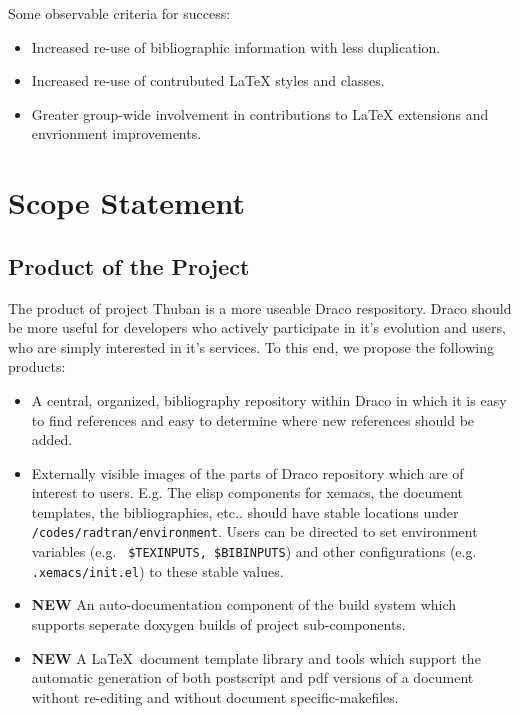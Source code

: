 \documentclass[note]{ResearchNote_pdf}
\begin{document}
Some observable criteria for success:

\begin{itemize}
\item Increased re-use of bibliographic information with less
  duplication.
\item Increased re-use of contrubuted LaTeX styles and classes.
\item Greater group-wide involvement in contributions to LaTeX
  extensions and envrionment improvements.
\end{itemize}

\section*{Scope Statement}


\subsection*{Product of the Project}

The product of project Thuban is a more useable {\sf Draco}
respository.  {\sf Draco} should be more useful for developers who
actively participate in it's evolution and users, who are simply
interested in it's services.  To this end, we propose the following
products:

\begin{itemize}
  \item A central, organized, bibliography repository within {\sf Draco} in
    which it is easy to find references and easy to determine where
    new references should be added.
  \item Externally visible images of the parts of {\sf Draco} repository
    which are of interest to users. E.g. The elisp components for
    xemacs, the document templates, the bibliographies, etc.. should
    have stable locations under {\tt /codes/radtran/environment}.
    Users can be directed to set environment variables (e.g. {\tt
      \$TEXINPUTS, \$BIBINPUTS}) and other configurations (e.g. {\tt
      .xemacs/init.el}) to these stable values.
  \item {\bf NEW} An auto-documentation component of the build system
    which supports seperate doxygen builds of project sub-components.
  \item {\bf NEW} A \LaTeX\ document template library and tools which
    support the automatic generation of both postscript and pdf
    versions of a document without re-editing and without document
    specific-makefiles.
\end{itemize}
\end{document}
